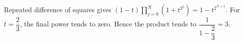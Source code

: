Repeated difference of squares gives $(1-t)\prod_{j=0}^{N}(1+t^{2^j})=1-t^{2^{N+1}}$. For $ t=\dfrac{2}{3}$, the final power tends to zero. Hence the product tends to $\dfrac{1}{1-\dfrac{2}{3}}=\boxed3 $.
